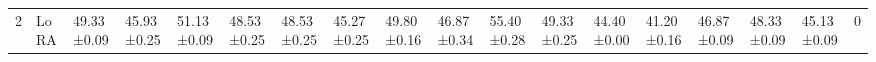 \begin{table*}[t]
\begin{scriptsize}
{\begin{tabular}{c|l|l|l|l|l|l|l|l|l|l|l|l|l|l|l|l|c}
\multirow{5}{*}{2}  & LoRA                                   & 49.33±0.09                       & 45.93±0.25                       & 51.13±0.09                       & 48.53±0.25                       & 48.53±0.25                       & 45.27±0.25                       & 49.80±0.16                        & 46.87±0.34                       & 55.40±0.28                        & 49.33±0.25                       & 44.40±0.00                        & 41.20±0.16                        & 46.87±0.09                       & 48.33±0.09                       & 45.13±0.09                       & 0             \\ %

\end{tabular}}
\end{scriptsize}
\end{table*}
